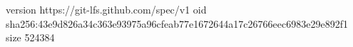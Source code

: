 version https://git-lfs.github.com/spec/v1
oid sha256:43e9d826a34c363e93975a96cfeab77e1672644a17c26766eec6983e29e892f1
size 524384
